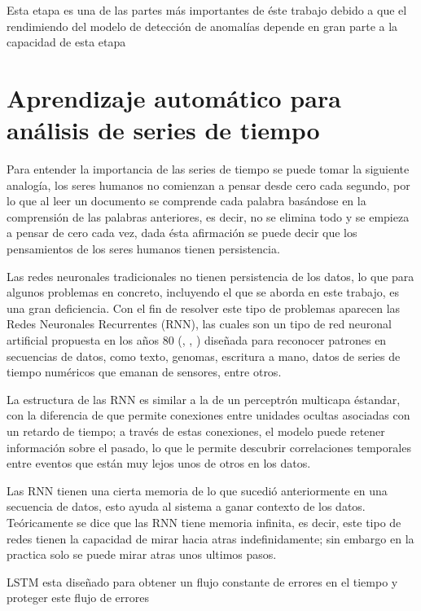 Esta etapa es una de las partes m\'{a}s importantes de \'{e}ste trabajo debido a que el rendimiendo del modelo de detecci\'{o}n de anomal\'{i}as depende en gran parte a la capacidad  de esta etapa

\section{Aprendizaje autom\'{a}tico para an\'{a}lisis de series de tiempo}

Para entender la importancia de las series de tiempo se puede tomar la siguiente analog\'{i}a, los seres humanos no comienzan a pensar desde cero cada segundo, por lo que al leer un documento se comprende cada palabra bas\'{a}ndose en la comprensi\'{o}n de las palabras anteriores, es decir, no se elimina todo y se empieza a pensar de cero cada vez, dada \'{e}sta afirmaci\'{o}n se puede decir que los pensamientos de los seres humanos tienen persistencia.

\vspace{5mm} %

Las redes neuronales tradicionales no tienen persistencia de los datos, lo que para algunos problemas en concreto, incluyendo el que se aborda en este trabajo, es una gran deficiencia. Con el fin de resolver este tipo de problemas aparecen las Redes Neuronales Recurrentes (RNN), las cuales son un tipo de red neuronal artificial propuesta en los a\~{n}os 80 (\cite{34}, \cite{35}, \cite{36}) dise\~{n}ada para reconocer patrones en secuencias de datos, como texto, genomas, escritura a mano, datos de series de tiempo num\'{e}ricos que emanan de sensores, entre otros.

\vspace{5mm} %

La estructura de las RNN es similar a la de un perceptr\'{o}n multicapa \'{e}standar, con la diferencia de que permite conexiones entre unidades ocultas asociadas con un retardo de tiempo; a trav\'{e}s de estas conexiones, el modelo puede retener informaci\'{o}n sobre el pasado, lo que le permite descubrir correlaciones temporales entre eventos que est\'{a}n muy lejos unos de otros en los datos.

Las RNN tienen una cierta memoria de lo que sucedi\'{o} anteriormente en una secuencia de datos, esto ayuda al sistema a ganar contexto de los datos. Te\'{o}ricamente se dice que las RNN tiene memoria infinita, es decir, este tipo de redes tienen la capacidad de mirar hacia atras indefinidamente; sin embargo en la practica solo se puede mirar atras unos ultimos pasos.

LSTM esta dise\~{n}ado para obtener un flujo constante de errores en el tiempo y proteger este flujo de errores

